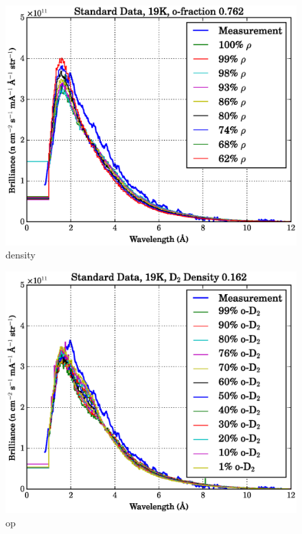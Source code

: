 \documentclass[preprint,12pt]{elsarticle}
\begin{document}
\begin{figure}[h!] 
  \centering
    \includegraphics[width=\columnwidth]{graphics/density_compare.eps}
     \caption{density \label{fig:density_compare}}
\end{figure}

\begin{figure}[h!] 
  \centering
    \includegraphics[width=\columnwidth]{graphics/op_compare.eps}
     \caption{op \label{fig:op_compare}}
\end{figure}
\end{document}
